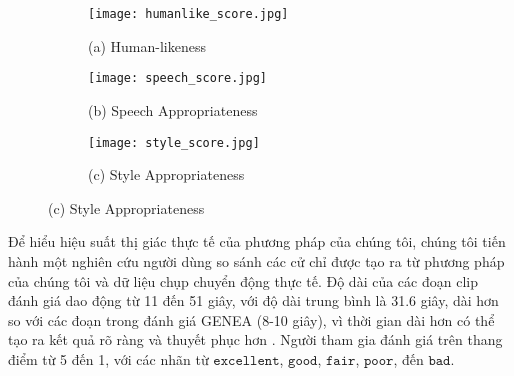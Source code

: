 \begin{figure}[htbp]
	\centering
	\begin{subfigure}[b]{0.3\textwidth}
		\texttt{[image: humanlike\_score.jpg]}
		\caption*{(a) Human-likeness}
	\end{subfigure}
	\hfill
	\begin{subfigure}[b]{0.3\textwidth}
		\texttt{[image: speech\_score.jpg]}
		\caption*{\small (b) Speech Appropriateness}
	\end{subfigure}
	\hfill
	\begin{subfigure}[b]{0.3\textwidth}
		\texttt{[image: style\_score.jpg]}
		\caption*{(c) Style Appropriateness}
	\end{subfigure}
	
	\label{fig:compare }
\end{figure}


Để hiểu hiệu suất thị giác thực tế của phương pháp của chúng tôi, chúng tôi tiến hành một nghiên cứu người dùng so sánh các cử chỉ được tạo ra từ phương pháp của chúng tôi và dữ liệu chụp chuyển động thực tế. Độ dài của các đoạn clip đánh giá dao động từ 11 đến 51 giây, với độ dài trung bình là 31.6 giây, dài hơn so với các đoạn trong đánh giá GENEA \cite{yoon2022genea} (8-10 giây), vì thời gian dài hơn có thể tạo ra kết quả rõ ràng và thuyết phục hơn \cite{yang2022reprgesture}. Người tham gia đánh giá trên thang điểm từ 5 đến 1, với các nhãn từ $\texttt{excellent}$,  $\texttt{good}$, $\texttt{fair}$, $\texttt{poor}$, đến $\texttt{bad}$. 


